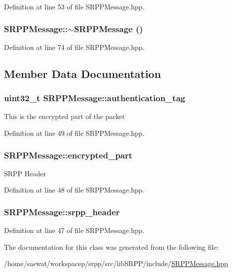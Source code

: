 Definition at line 53 of file SRPPMessage.hpp.

\hypertarget{class_s_r_p_p_message_ad9f1e4ee16c1d6de798da5d8a5bafc37}{
\subsubsection[{$\sim$SRPPMessage}]{\setlength{\rightskip}{0pt plus 5cm}SRPPMessage::$\sim$SRPPMessage ()}}
\label{class_s_r_p_p_message_ad9f1e4ee16c1d6de798da5d8a5bafc37}


Definition at line 74 of file SRPPMessage.hpp.



\subsection{Member Data Documentation}
\hypertarget{class_s_r_p_p_message_ab4f881f399364dfa40d003bd19ffa411}{
\subsubsection[{authentication\_\-tag}]{\setlength{\rightskip}{0pt plus 5cm}uint32\_\-t {\bf SRPPMessage::authentication\_\-tag}}}
\label{class_s_r_p_p_message_ab4f881f399364dfa40d003bd19ffa411}
This is the encrypted part of the packet 

Definition at line 49 of file SRPPMessage.hpp.

\hypertarget{class_s_r_p_p_message_a73d0173615ff24ee5c920e2a9218a047}{
\subsubsection[{encrypted\_\-part}]{ {\bf SRPPMessage::encrypted\_\-part}}}
\label{class_s_r_p_p_message_a73d0173615ff24ee5c920e2a9218a047}
SRPP Header 

Definition at line 48 of file SRPPMessage.hpp.

\hypertarget{class_s_r_p_p_message_a690a8a2664ee4c03daef67bcd9f26990}{
\subsubsection[{srpp\_\-header}]{ {\bf SRPPMessage::srpp\_\-header}}}
\label{class_s_r_p_p_message_a690a8a2664ee4c03daef67bcd9f26990}


Definition at line 47 of file SRPPMessage.hpp.



The documentation for this class was generated from the following file:\begin{DoxyCompactItemize}
\item 
/home/saswat/workspacep/srpp/src/libSRPP/include/\hyperlink{_s_r_p_p_message_8hpp}{SRPPMessage.hpp}\end{DoxyCompactItemize}
